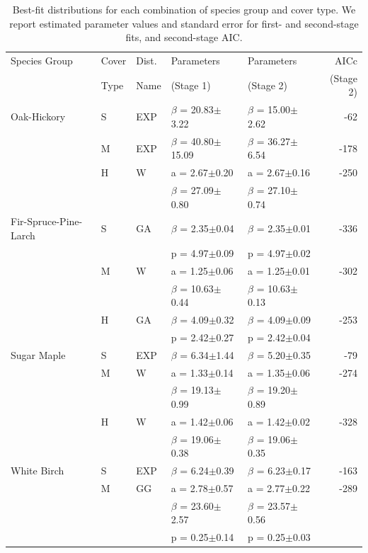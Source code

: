 \documentclass{article}
\begin{document}
\begin{table}
\caption{Best-fit distributions for each combination of species group
  and cover type. We report estimated parameter values and standard
  error for first- and second-stage fits, and second-stage AIC.}
\label{tab:results}
{\footnotesize
\begin{tabular}{lllllr}
\toprule
Species Group & Cover & Dist. & Parameters & Parameters & AICc \\
& Type & Name & (Stage 1) & (Stage 2) & (Stage 2) \\
\midrule
Oak-Hickory & S & EXP & $\beta$ = 20.83$\pm$3.22 & $\beta$ = 15.00$\pm$2.62 & -62 \\
 & M & EXP & $\beta$ = 40.80$\pm$15.09 & $\beta$ = 36.27$\pm$6.54 & -178 \\
 & H & W & a = 2.67$\pm$0.20 & a = 2.67$\pm$0.16 & -250 \\
 &  &  & $\beta$ = 27.09$\pm$0.80 & $\beta$ = 27.10$\pm$0.74 &  \\
Fir-Spruce-Pine-Larch & S & GA & $\beta$ = 2.35$\pm$0.04 & $\beta$ = 2.35$\pm$0.01 & -336 \\
 &  &  & p = 4.97$\pm$0.09 & p = 4.97$\pm$0.02 &  \\
 & M & W & a = 1.25$\pm$0.06 & a = 1.25$\pm$0.01 & -302 \\
 &  &  & $\beta$ = 10.63$\pm$0.44 & $\beta$ = 10.63$\pm$0.13 &  \\
 & H & GA & $\beta$ = 4.09$\pm$0.32 & $\beta$ = 4.09$\pm$0.09 & -253 \\
 &  &  & p = 2.42$\pm$0.27 & p = 2.42$\pm$0.04 &  \\
Sugar Maple & S & EXP & $\beta$ = 6.34$\pm$1.44 & $\beta$ = 5.20$\pm$0.35 & -79 \\
 & M & W & a = 1.33$\pm$0.14 & a = 1.35$\pm$0.06 & -274 \\
 &  &  & $\beta$ = 19.13$\pm$0.99 & $\beta$ = 19.20$\pm$0.89 &  \\
 & H & W & a = 1.42$\pm$0.06 & a = 1.42$\pm$0.02 & -328 \\
 &  &  & $\beta$ = 19.06$\pm$0.38 & $\beta$ = 19.06$\pm$0.35 &  \\
White Birch & S & EXP & $\beta$ = 6.24$\pm$0.39 & $\beta$ = 6.23$\pm$0.17 & -163 \\
 & M & GG & a = 2.78$\pm$0.57 & a = 2.77$\pm$0.22 & -289 \\
 &  &  & $\beta$ = 23.60$\pm$2.57 & $\beta$ = 23.57$\pm$0.56 &  \\
 &  &  & p = 0.25$\pm$0.14 & p = 0.25$\pm$0.03 &  \\

\end{tabular}}
\end{table}
\end{document}
